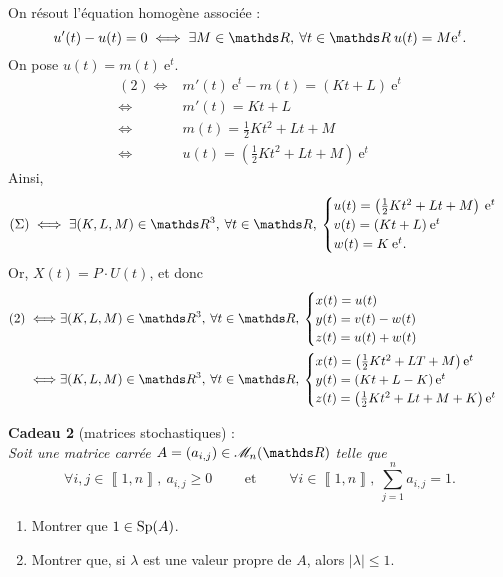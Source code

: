 \documentclass[a4paper]{article}
\begin{document}
\begin{enumerate}
\begin{align*}
			\end{align*}
			On résout l'équation homogène associée : \[
				u'(t) - u(t) = 0 \iff \exists M \in \R,\:\forall t \in \R\:u(t) = M \mathrm{e}^{t}
			.\]
			On pose $u(t) = m(t)\:\mathrm{e}^{t}$.
			\begin{align*}
				(2) \iff& m'(t)\:\mathrm{e}^{t} - m(t) = (Kt + L)\:\mathrm{e}^{t}\\
				\iff& m'(t) = K t + L\\
				\iff& m(t) = \frac{1}{2} Kt^2 + Lt + M\\
				\iff& u(t) = \left( \frac{1}{2} Kt^2 + L t + M \right)\:\mathrm{e}^{t}
			\end{align*}
			Ainsi, \[
				(\Sigma) \iff \exists (K,L,M) \in \R^3,\:\forall t \in \R,\: \begin{cases}
					u(t) = \left( \frac{1}{2} Kt^2 + Lt + M \right)\:\mathrm{e}^{t}\\
					v(t) = (Kt + L)\:\mathrm{e}^{t}\\
					w(t) = K\:\mathrm{e}^{t}.
				\end{cases}
			\] Or, $X(t) = P \cdot U(t)$, et donc
			\begin{align*}
				(2) \iff& \exists (K,L,M) \in \R^3,\:\forall t \in \R,\: \begin{cases}
					x(t) = u(t)\\
					y(t) = v(t) - w(t)\\
					z(t) = u(t) + w(t)
				\end{cases}\\
				\iff& \exists (K,L,M) \in \R^3,\:\forall t \in \R,\: \begin{cases}
					x(t) = \left( \frac{1}{2} K t^2 + LT + M \right) \mathrm{e}^{t}\\
					y(t) = \left( Kt + L - K \right)\mathrm{e}^{t}\\
					z(t) = \left( \frac{1}{2}Kt^2 + Lt + M + K \right)\mathrm{e}^{t}
				\end{cases}
			\end{align*}
	\end{enumerate}
	\bigskip
	\bigskip
	{\bf Cadeau 2} (matrices stochastiques) :\\
	\slshape
	Soit une matrice carrée $A = (a_{i,j}) \in \mathscr{M}_n(\R)$\/ telle que \[
		\forall i,j \in \left\llbracket 1,n \right\rrbracket,\:a_{i,j} \ge 0\qquad\text{ et }\qquad \forall i \in \left\llbracket 1,n \right\rrbracket,\:\sum_{j=1}^n a_{i,j} = 1
	.\]
	\begin{enumerate}
		\item Montrer que $1 \in \operatorname{Sp}(A)$.
		\item Montrer que, si $\lambda$\/ est une valeur propre de $A$, alors $|\lambda| \le 1$.
	\end{enumerate}
	\upshape
\end{document}
